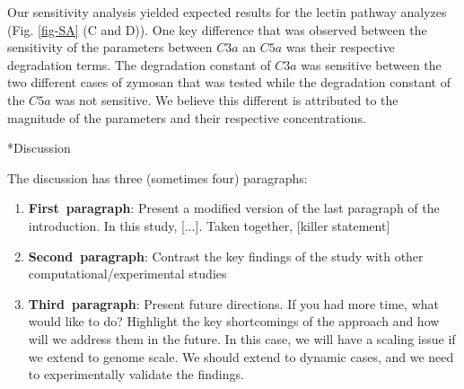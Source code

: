 \documentclass[12pt]{article}
\makeatletter
\renewcommand\section{\@startsection
	{subsection}{2}{0mm}
	{-0.2in}
	{0.05\baselineskip}
	{\normalfont\large\bfseries}}
\makeatother
\begin{document}
Our sensitivity analysis yielded expected results for the lectin pathway analyzes (Fig. \ref{fig-SA} (C and D)). One key difference that was observed between the sensitivity of the parameters between $C3a$ an $C5a$ was their respective degradation terms. The degradation constant of $C3a$ was sensitive between the two different cases of zymosan that was tested while the degradation constant of the $C5a$ was not sensitive. We believe this different is attributed to the magnitude of the parameters and their respective concentrations. 


\clearpage

%

\section*{Discussion}

The discussion has three (sometimes four) paragraphs:
\begin{enumerate}
	\item{\textbf{First~paragraph}: Present a modified version of the last paragraph of the introduction. In this study, [...]. Taken together, [killer statement]}
	\item{\textbf{Second~paragraph}: Contrast the key findings of the study with other computational/experimental studies}
	\item{\textbf{Third~paragraph}: Present future directions. If you had more time, what would like to do? Highlight the key shortcomings of the approach and how will we address them in the future.
	In this case, we will have a scaling issue if we extend to genome scale. We should extend to dynamic cases, and we need to experimentally validate the findings. }
\end{enumerate}

\clearpage
\end{document}
